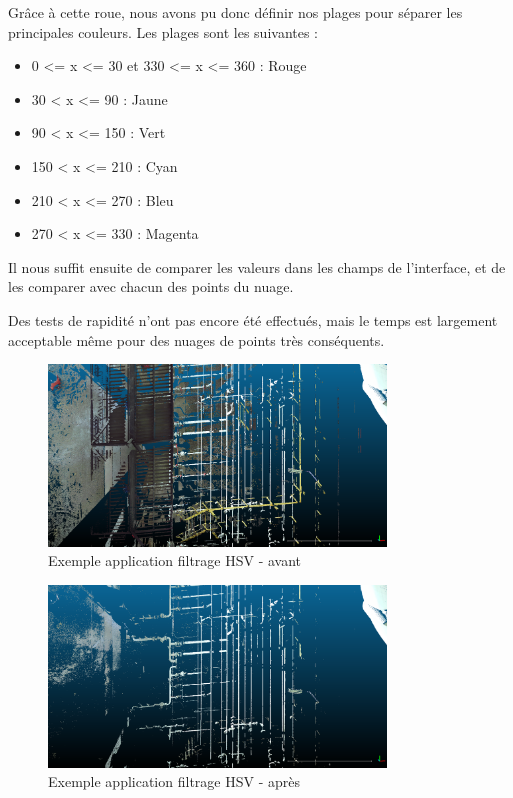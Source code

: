 \documentclass[12pt,titlepage,french]{article}
\begin{document}
Grâce à cette roue, nous avons pu donc définir nos plages pour séparer les principales couleurs. Les plages sont les suivantes :

\begin{itemize}
  \item 0 <= x <= 30 et 330 <= x <= 360 : Rouge
  \item 30 < x <= 90 : Jaune
  \item 90 < x <= 150 : Vert
  \item 150 < x <= 210 : Cyan
  \item 210 < x <= 270 : Bleu
  \item 270 < x <= 330 : Magenta \newline
\end{itemize}

Il nous suffit ensuite de comparer les valeurs dans les champs de l'interface, et de les comparer avec chacun des points du nuage. \newline

Des tests de rapidité n'ont pas encore été effectués, mais le temps est largement acceptable même pour des nuages de points très conséquents.

\begin{figure}[H]
 \caption{\label{} Exemple application filtrage HSV - avant}
 \begin{center}
 \includegraphics[width=0.8\textwidth]{./img/hsv_before.PNG}
  \end{center}
\end{figure}

\begin{figure}[H]
 \caption{\label{} Exemple application filtrage HSV - après}
 \begin{center}
 \includegraphics[width=0.8\textwidth]{./img/hsv_after.PNG}
  \end{center}
\end{figure}
\end{document}
